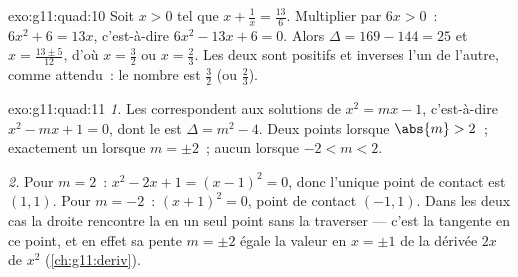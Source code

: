 \begin{solution}{exo:g11:quad:10}
Soit $x > 0$ tel que $x + \frac1x = \frac{13}{6}$. Multiplier par
$6x > 0$~: $6x^2 + 6 = 13x$, c'est-à-dire $6x^2 - 13x + 6 = 0$. Alors
$\Delta = 169 - 144 = 25$ et $x = \frac{13 \pm 5}{12}$, d'où
$x = \frac32$ ou $x = \frac23$. Les deux sont positifs et inverses l'un
de l'autre, comme attendu~: le nombre est $\frac32$ (ou $\frac23$).
\end{solution}

\begin{solution}{exo:g11:quad:11}
\emph{1.} Les  correspondent aux solutions de
$x^2 = mx - 1$, c'est-à-dire $x^2 - mx + 1 = 0$, dont le  est
$\Delta = m^2 - 4$. Deux points lorsque $\abs{m} > 2$~; exactement un
lorsque $m = \pm 2$~; aucun lorsque $-2 < m < 2$.

\emph{2.} Pour $m = 2$~: $x^2 - 2x + 1 = (x-1)^2 = 0$, donc l'unique
point de contact est $(1, 1)$. Pour $m = -2$~: $(x+1)^2 = 0$, point de
contact $(-1, 1)$. Dans les deux cas la droite rencontre la  en
un seul point sans la traverser --- c'est la tangente en ce point, et en
effet sa pente $m = \pm 2$ égale la valeur en $x = \pm 1$ de la dérivée
$2x$ de $x^2$ (\cref{ch:g11:deriv}).
\end{solution}

